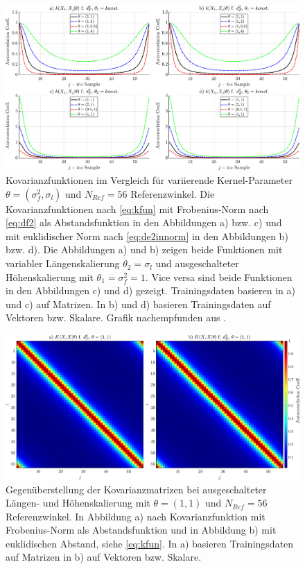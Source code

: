 \clearpage
\begin{landscape}
\begin{figure}[tbph]
\centering
\includegraphics[width=.9\linewidth]{chapters/images/4-EuOExp/Vergleich-Kovarianzfunktionen}
\caption[Kovarianzfunktionen im Vergleich]{Kovarianzfunktionen im Vergleich für variierende Kernel-Parameter $\theta = (\sigma_f^2, \sigma_l)$ und $N_{Ref} = 56$ Referenzwinkel. Die Kovarianzfunktionen nach \autoref{eq:kfun} mit Frobenius-Norm nach \autoref{eq:df2} als Abstandsfunktion in den Abbildungen a) bzw. c) und mit euklidischer Norm nach \autoref{eq:de2innorm} in den Abbildungen b) bzw. d). Die Abbildungen a) und b) zeigen beide Funktionen mit variabler Längenskalierung $\theta_2 = \sigma_l$ und ausgeschalteter Höhenskalierung mit $\theta_1 = \sigma_f^2 = 1$. Vice versa sind beide Funktionen in den Abbildungen c) und d) gezeigt. Trainingsdaten basieren in a) und c) auf Matrizen. In b) und d) basieren Trainingsdaten auf Vektoren bzw. Skalare. Grafik nachempfunden aus \cite{Lang2014}.}
\label{fig:vergleich-kovarianzfunktionen}
\end{figure}
\end{landscape}


\clearpage
\begin{landscape}
\begin{figure}[tbph]
\centering
\includegraphics[width=\linewidth]{chapters/images/4-EuOExp/Vergleich-Kovarianzmatrizen}
\caption[Gegenüberstellung der Kovarianzmatrizen]{Gegenüberstellung der Kovarianzmatrizen bei ausgeschalteter Längen- und Höhenskalierung mit $\theta = (1,1)$ und $N_{Ref} = 56$ Referenzwinkel. In Abbildung a) nach Kovarianzfunktion mit Frobenius-Norm als Abstandsfunktion und in Abbildung b) mit euklidischen Abstand, siehe \autoref{eq:kfun}. In a) basieren Trainingsdaten auf Matrizen in b) auf Vektoren bzw. Skalare.}
\label{fig:vergleich-kovarianzmatrizen}
\end{figure}
\end{landscape}


